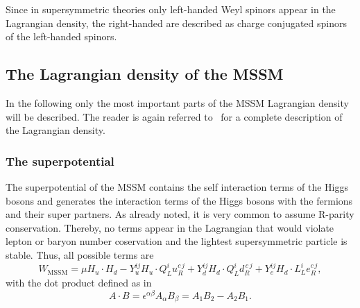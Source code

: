 Since in supersymmetric theories only left-handed Weyl spinors appear in the Lagrangian density, the right-handed are described as charge conjugated spinors of the left-handed spinors.

\subsection{The Lagrangian density of the MSSM}
\label{sec:Lagrange_MSSM}
In the following only the most important parts of the MSSM Lagrangian density will be described.
The reader is again referred to~\cite{bib:Drees} for a complete description of the Lagrangian density.

\subsubsection*{The superpotential}
The superpotential of the MSSM contains the self interaction terms of the Higgs bosons and generates the interaction terms of the Higgs bosons with the fermions and their super partners.
As already noted, it is very common to assume R-parity conservation.
Thereby, no terms appear in the Lagrangian that would violate lepton or baryon number coservation and the lightest supersymmetric particle is stable.
Thus, all possible terms are
\begin{equation}
\label{eq:SPMSSM}
 W_{\text{MSSM}} = \mu H_u \cdot H_d - Y_u^{ij} H_u \cdot Q_L^i u_R^{c\,j} + Y_d^{ij} H_d \cdot Q_L^i d_R^{\,c\,j} + Y_e^{ij} H_d \cdot L_L^i e_R^{c\,j},
\end{equation}
with the dot product defined as in ~\cite{} 
\begin{equation}
 A \cdot B = \epsilon^{\alpha\beta} A_{\alpha} B_{\beta} = A_1 B_2 - A_2 B_1.
\end{equation}

